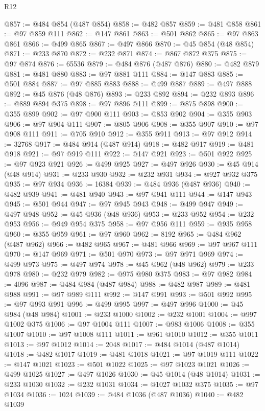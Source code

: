 \begin{lexlean}{R12}
\begin{coremodule}
@857 := @484 @854 (@487 @854)
@858 := @482 @857
@859 := @481 @858
@861 := @97 @859 @111
@862 := @147 @861
@863 := @501 @862
@865 := @97 @863 @861
@866 := @499 @865
@867 := @497 @866
@870 := @45 @854 (@48 @854)
@871 := @233 @870
@872 := @232 @871
@874 := @867 @872 @375
@875 := @97 @874
@876 := 65536
@879 := @484 @876 (@487 @876)
@880 := @482 @879
@881 := @481 @880
@883 := @97 @881 @111
@884 := @147 @883
@885 := @501 @884
@887 := @97 @885 @883
@888 := @499 @887
@889 := @497 @888
@892 := @45 @876 (@48 @876)
@893 := @233 @892
@894 := @232 @893
@896 := @889 @894 @375
@898 := @97 @896 @111
@899 := @875 @898
@900 := @355 @899
@902 := @97 @900 @111
@903 := @853 @902
@904 := @355 @903
@906 := @97 @904 @111
@907 := @805 @906
@908 := @355 @907
@910 := @97 @908 @111
@911 := @705 @910
@912 := @355 @911
@913 := @97 @912
@914 := 32768
@917 := @484 @914 (@487 @914)
@918 := @482 @917
@919 := @481 @918
@921 := @97 @919 @111
@922 := @147 @921
@923 := @501 @922
@925 := @97 @923 @921
@926 := @499 @925
@927 := @497 @926
@930 := @45 @914 (@48 @914)
@931 := @233 @930
@932 := @232 @931
@934 := @927 @932 @375
@935 := @97 @934
@936 := 16384
@939 := @484 @936 (@487 @936)
@940 := @482 @939
@941 := @481 @940
@943 := @97 @941 @111
@944 := @147 @943
@945 := @501 @944
@947 := @97 @945 @943
@948 := @499 @947
@949 := @497 @948
@952 := @45 @936 (@48 @936)
@953 := @233 @952
@954 := @232 @953
@956 := @949 @954 @375
@958 := @97 @956 @111
@959 := @935 @958
@960 := @355 @959
@961 := @97 @960
@962 := 8192
@965 := @484 @962 (@487 @962)
@966 := @482 @965
@967 := @481 @966
@969 := @97 @967 @111
@970 := @147 @969
@971 := @501 @970
@973 := @97 @971 @969
@974 := @499 @973
@975 := @497 @974
@978 := @45 @962 (@48 @962)
@979 := @233 @978
@980 := @232 @979
@982 := @975 @980 @375
@983 := @97 @982
@984 := 4096
@987 := @484 @984 (@487 @984)
@988 := @482 @987
@989 := @481 @988
@991 := @97 @989 @111
@992 := @147 @991
@993 := @501 @992
@995 := @97 @993 @991
@996 := @499 @995
@997 := @497 @996
@1000 := @45 @984 (@48 @984)
@1001 := @233 @1000
@1002 := @232 @1001
@1004 := @997 @1002 @375
@1006 := @97 @1004 @111
@1007 := @983 @1006
@1008 := @355 @1007
@1010 := @97 @1008 @111
@1011 := @961 @1010
@1012 := @355 @1011
@1013 := @97 @1012
@1014 := 2048
@1017 := @484 @1014 (@487 @1014)
@1018 := @482 @1017
@1019 := @481 @1018
@1021 := @97 @1019 @111
@1022 := @147 @1021
@1023 := @501 @1022
@1025 := @97 @1023 @1021
@1026 := @499 @1025
@1027 := @497 @1026
@1030 := @45 @1014 (@48 @1014)
@1031 := @233 @1030
@1032 := @232 @1031
@1034 := @1027 @1032 @375
@1035 := @97 @1034
@1036 := 1024
@1039 := @484 @1036 (@487 @1036)
@1040 := @482 @1039

\end{coremodule}
\end{lexlean}
